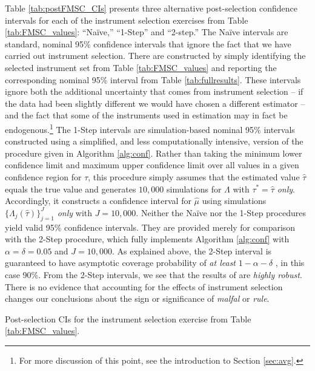 Table \ref{tab:postFMSC_CIs} presents three alternative post-selection confidence intervals for each of the instrument selection exercises from Table \ref{tab:FMSC_values}: ``Na\"{i}ve,'' ``1-Step'' and ``2-step.''
The Na\"{i}ve intervals are standard, nominal 95\% confidence intervals that ignore the fact that we have carried out instrument selection. 
There are constructed by simply identifying the selected instrument set from Table \ref{tab:FMSC_values} and reporting the corresponding nominal 95\% interval from Table \ref{tab:fullresults}.
These intervals ignore both the additional uncertainty that comes from instrument selection -- if the data had been slightly different we would have chosen a different estimator -- and the fact that some of the instruments used in estimation may in fact be endogenous.\footnote{For more discussion of this point, see the introduction to Section \ref{sec:avg}.}
The 1-Step intervals are simulation-based nominal 95\% intervals constructed using a simplified, and less computationally intensive, version of the procedure given in Algorithm \ref{alg:conf}.
Rather than taking the minimum lower confidence limit and maximum upper confidence limit over all values in a given confidence region for $\tau$, this procedure simply assumes that the estimated value $\widehat{\tau}$ equals the true value and generates $10,000$ simulations for $\Lambda$ with $\tau^* =\widehat{\tau}$ \emph{only}.
Accordingly, it constructs a confidence interval for $\widehat{\mu}$ using simulations $\{\Lambda_j(\widehat{\tau})\}_{j=1}^J$ \emph{only} with $J = 10,000$.
Neither the Na\"{i}ve nor the 1-Step procedures yield valid 95\% confidence intervals.
They are provided merely for comparison with the 2-Step procedure, which fully implements Algorithm \ref{alg:conf} with $\alpha = \delta = 0.05$ and $J=10,000$. As explained above, the 2-Step interval is guaranteed to have asymptotic coverage probability of \emph{at least} $1 - \alpha - \delta$ , in this case 90\%.
From the 2-Step intervals, we see that the results of \cite{Carstensen2006} are \emph{highly robust}. 
There is no evidence that accounting for the effects of instrument selection changes our conclusions about the sign or significance of \emph{malfal} or \emph{rule}.

\begin{table}[htbp]
	\centering
	
	\caption{Post-selection CIs for the instrument selection exercise from Table \ref{tab:FMSC_values}.}
	\label{tab:postFMSC_CIs}
\end{table}


